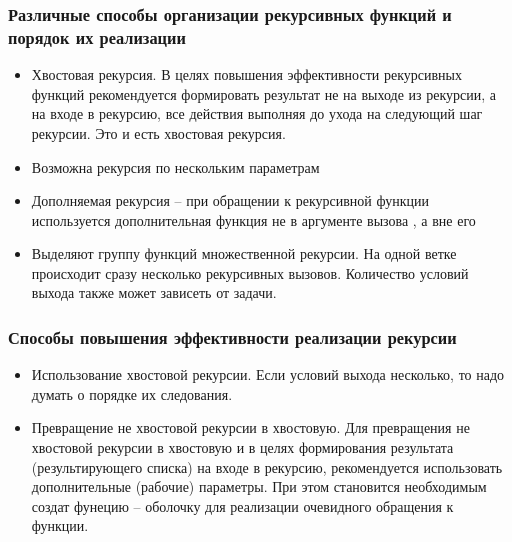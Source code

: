 \subsubsection{Различные способы организации
рекурсивных функций и порядок их реализации}

\begin{itemize}
    \item Хвостовая рекурсия. В целях повышения эффективности рекурсивных
        функций рекомендуется формировать результат не на выходе из рекурсии,
        а на входе в рекурсию, все действия выполняя до ухода на следующий шаг
        рекурсии. Это и есть хвостовая рекурсия.
    \item Возможна рекурсия по нескольким параметрам
    \item Дополняемая рекурсия -- при обращении к рекурсивной функции
        используется дополнительная функция не в аргументе вызова , а вне его
    \item Выделяют группу функций множественной рекурсии. На одной
        ветке происходит сразу несколько рекурсивных вызовов. Количество
        условий выхода также может зависеть от задачи.
\end{itemize}

\subsubsection{Способы повышения эффективности реализации рекурсии}

\begin{itemize}
    \item Использование хвостовой рекурсии.
        Если условий выхода несколько, то надо думать о порядке их следования.
    \item Превращение не хвостовой рекурсии в хвостовую.
        Для превращения не хвостовой рекурсии в хвостовую и в целях
        формирования результата (результирующего списка) на входе в
        рекурсию, рекомендуется использовать дополнительные (рабочие)
        параметры. При этом становится необходимым создат фунецию --
        оболочку для реализации очевидного обращения к функции.
\end{itemize}
